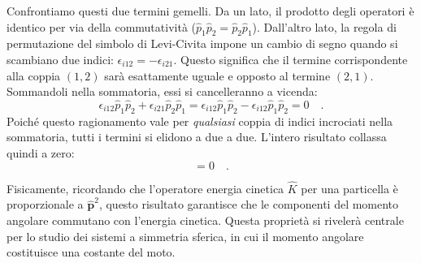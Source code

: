 Confrontiamo questi due termini gemelli. Da un lato, il prodotto degli operatori è identico per via della commutatività ($\hat{p}_1\hat{p}_2 = \hat{p}_2\hat{p}_1$). Dall'altro lato, la regola di permutazione del simbolo di Levi-Civita impone un cambio di segno quando si scambiano due indici: $\epsilon_{i12} = -\epsilon_{i21}$.
Questo significa che il termine corrispondente alla coppia $(1,2)$ sarà esattamente uguale e opposto al termine $(2,1)$. Sommandoli nella sommatoria, essi si cancelleranno a vicenda:
\[
    \epsilon_{i12} \hat{p}_1\hat{p}_2 + \epsilon_{i21} \hat{p}_2\hat{p}_1 = \epsilon_{i12} \hat{p}_1\hat{p}_2 - \epsilon_{i12} \hat{p}_1\hat{p}_2 = 0 \quad.
\]
Poiché questo ragionamento vale per \emph{qualsiasi} coppia di indici incrociati nella sommatoria, tutti i termini si elidono a due a due. L'intero risultato collassa quindi a zero:
\begin{equation*}
    [\hat{L}_i, \hat{\bm{p}}^2] = 0 \quad.
\end{equation*}

Fisicamente, ricordando che l'operatore energia cinetica $\hat{K}$ per una particella è proporzionale a $\hat{\bm{p}}^2$, questo risultato garantisce che le componenti del momento angolare commutano con l'energia cinetica. Questa proprietà si rivelerà centrale per lo studio dei sistemi a simmetria sferica, in cui il momento angolare costituisce una costante del moto.